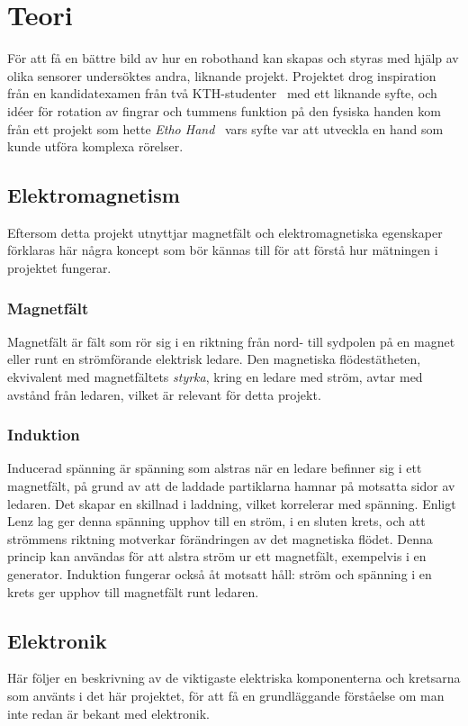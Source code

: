 \documentclass[a4paper]{article}
\begin{document}
\begin{sloppypar}
    \newpage
    \section{Teori}
    För att få en bättre bild av hur en robothand kan skapas och styras med hjälp av olika sensorer undersöktes andra, liknande projekt.
    Projektet drog inspiration från en kandidatexamen från två KTH-studenter~\cite{KTHhand} med ett liknande syfte, och
    idéer för rotation av fingrar och tummens funktion på den fysiska handen kom från ett projekt som hette \textit{Etho Hand}~\cite{EthoHand}
    vars syfte var att utveckla en hand som kunde utföra komplexa rörelser.


    \subsection{Elektromagnetism}
    Eftersom detta projekt utnyttjar magnetfält och elektromagnetiska egenskaper förklaras här några koncept som bör kännas till för att förstå hur mätningen i projektet fungerar.
    \subsubsection{Magnetfält}
    Magnetfält är fält som rör sig i en riktning från nord- till sydpolen på en magnet eller runt en strömförande elektrisk ledare.
    Den magnetiska flödestätheten, ekvivalent med magnetfältets \textit{styrka}, kring en ledare med ström, avtar med avstånd från ledaren,
    vilket är relevant för detta projekt.~\cite{digilar}
    \subsubsection{Induktion}
    Inducerad spänning är spänning som alstras när en ledare befinner sig i ett magnetfält, på grund av att de laddade partiklarna hamnar på motsatta sidor av ledaren.
    Det skapar en skillnad i laddning, vilket korrelerar med spänning.
    Enligt Lenz lag ger denna spänning upphov till en ström, i en sluten krets, och att strömmens riktning motverkar förändringen av det magnetiska flödet.
    Denna princip kan användas för att alstra ström ur ett magnetfält, exempelvis i en generator.
    Induktion fungerar också åt motsatt håll: ström och spänning i en krets ger upphov till magnetfält runt ledaren.
    ~\cite{digilar}

    \subsection{Elektronik}
    Här följer en beskrivning av de viktigaste elektriska komponenterna och kretsarna som använts i det här projektet, för att få en grundläggande förståelse om man inte redan är bekant med elektronik.

\end{sloppypar}
\end{document}
